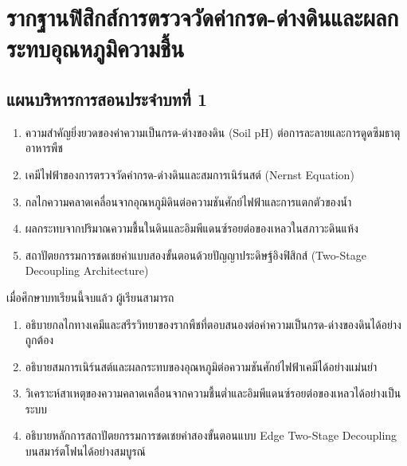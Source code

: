 \chapter{รากฐานฟิสิกส์การตรวจวัดค่ากรด-ด่างดินและผลกระทบอุณหภูมิความชื้น}
\label{chap:ch01}

\section*{แผนบริหารการสอนประจำบทที่ 1}

\begin{tcolorbox}[
    enhanced, breakable,
    colback=white, colframe=rbruNavy,
    fonttitle=\bfseries\color{white},
    title={1. หัวข้อเนื้อหาประจำบท},
    arc=1.5mm, boxrule=0.8pt, leftrule=3.5mm
]
\begin{enumerate}
    \item ความสำคัญยิ่งยวดของค่าความเป็นกรด-ด่างของดิน (Soil pH) ต่อการละลายและการดูดซึมธาตุอาหารพืช
    \item เคมีไฟฟ้าของการตรวจวัดค่ากรด-ด่างดินและสมการเนิร์นสต์ (Nernst Equation)
    \item กลไกความคลาดเคลื่อนจากอุณหภูมิดินต่อความชันศักย์ไฟฟ้าและการแตกตัวของน้ำ
    \item ผลกระทบจากปริมาณความชื้นในดินและอิมพีแดนซ์รอยต่อของเหลวในสภาวะดินแห้ง
    \item สถาปัตยกรรมการชดเชยค่าแบบสองขั้นตอนด้วยปัญญาประดิษฐ์อิงฟิสิกส์ (Two-Stage Decoupling Architecture)
\end{enumerate}
\end{tcolorbox}

\begin{tcolorbox}[
    enhanced, breakable,
    colback=white, colframe=rbruNavy,
    fonttitle=\bfseries\color{white},
    title={2. วัตถุประสงค์เชิงพฤติกรรม},
    arc=1.5mm, boxrule=0.8pt, leftrule=3.5mm
]
เมื่อศึกษาบทเรียนนี้จบแล้ว ผู้เรียนสามารถ
\begin{enumerate}
    \item อธิบายกลไกทางเคมีและสรีรวิทยาของรากพืชที่ตอบสนองต่อค่าความเป็นกรด-ด่างของดินได้อย่างถูกต้อง
    \item อธิบายสมการเนิร์นสต์และผลกระทบของอุณหภูมิต่อความชันศักย์ไฟฟ้าเคมีได้อย่างแม่นยำ
    \item วิเคราะห์สาเหตุของความคลาดเคลื่อนจากความชื้นต่ำและอิมพีแดนซ์รอยต่อของเหลวได้อย่างเป็นระบบ
    \item อธิบายหลักการสถาปัตยกรรมการชดเชยค่าสองขั้นตอนแบบ Edge Two-Stage Decoupling บนสมาร์ตโฟนได้อย่างสมบูรณ์
\end{enumerate}
\end{tcolorbox}

